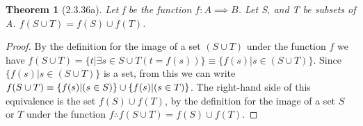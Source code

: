 \documentclass[a4paper, 12pt]{article}
\theoremstyle{plain}
\newtheorem*{theorem*}{Theorem}
\begin{document}
	
	\begin{theorem*}[2.3.36a]
		Let f be the function $f: A \implies B$. Let S, and T be subsets of A. 
		$f(S \cup T) = f(S) \cup f(T)$.
	\end{theorem*}
	
	\begin{proof}
		By the definition for the image of a set $(S \cup T)$ under the function $f$ we have 
		$f(S \cup T) = \{t | \exists s \in S \cup T (t = f(s))\} 
		\equiv \{f(s) | s \in (S \cup T)\}$. Since $\{f(s) | s \in (S \cup T)\}$ is a set, from 
		this we can write $f(S \cup T) \equiv 
		\newline \{f(s) | (s \in S)\} \cup \{f(s) | (s \in T)\}$. The right-hand side of this 
		equivalence is the set $f(S) \cup f(T)$, by the definition for the image of a set $S$ or 
		$T$ under the function $f \therefore f(S \cup T) = f(S) \cup f(T)$.
	\end{proof}
\end{document}
